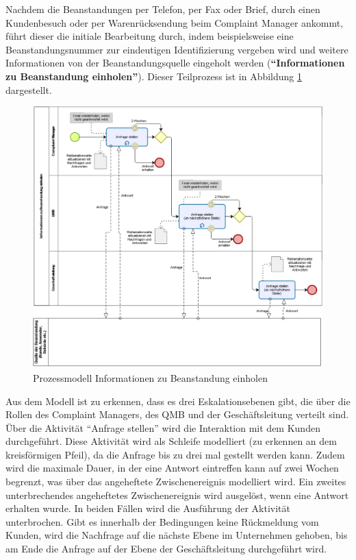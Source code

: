 \documentclass[a4paper,12pt]{report}
\begin{document}
Nachdem die Beanstandungen per Telefon, per Fax oder Brief, durch einen Kundenbesuch oder per Warenrücksendung beim Complaint Manager ankommt, führt dieser die initiale Bearbeitung durch, indem beispielsweise eine Beanstandungsnummer zur eindeutigen Identifizierung vergeben wird und weitere Informationen von der Beanstandungsquelle eingeholt werden (\textbf{"`Informationen zu Beanstandung einholen"'}). Dieser Teilprozess ist in Abbildung \ref{modell_informationen_einholen} dargestellt.
\begin{figure}[ht]
\centering
\includegraphics[width=1.0\textwidth]{Images/information_gathering}
\caption[Prozessmodell Informationen zu Beanstandung einholen]{Prozessmodell Informationen zu Beanstandung einholen}
\label{modell_informationen_einholen}
\end{figure}
Aus dem Modell ist zu erkennen, dass es drei Eskalationsebenen gibt, die über die Rollen des Complaint Managers, des QMB und der Geschäftsleitung verteilt sind. Über die Aktivität "`Anfrage stellen"' wird die Interaktion mit dem Kunden durchgeführt. Diese Aktivität wird als Schleife modelliert (zu erkennen an dem kreisförmigen Pfeil), da die Anfrage bis zu drei mal gestellt werden kann. Zudem wird die maximale Dauer, in der eine Antwort eintreffen kann auf zwei Wochen begrenzt, was über das angeheftete Zwischenereignis modelliert wird. Ein zweites unterbrechendes angeheftetes Zwischenereignis wird ausgelöst, wenn eine Antwort erhalten wurde. In beiden Fällen wird die Ausführung der Aktivität unterbrochen. Gibt es innerhalb der Bedingungen keine Rückmeldung vom Kunden, wird die Nachfrage auf die nächste Ebene im Unternehmen gehoben, bis am Ende die Anfrage auf der Ebene der Geschäftsleitung durchgeführt wird.
\end{document}
